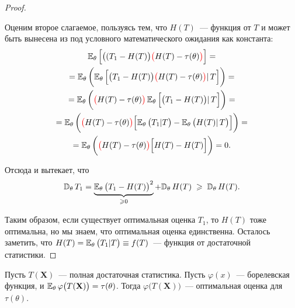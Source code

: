 \begin{proof}
\begin{enumerate}
            Оценим второе слагаемое, пользуясь тем, что $H(T)$~--- функция от $T$ и может быть вынесена из под условного математического ожидания как константа:
            \begin{gather*}
                \mathbb{E}_{\theta}\, \Bigl[ \bigl((T_{1}-H(T)\bigr) {\color{red}\bigl(} H(T) - \tau(\theta) {\color{red}\bigr)} \Bigr] = \\
                = \mathbb{E}_{\theta}\,\biggl( \mathbb{E}_{\theta}\,\Bigl[ \bigl(T_{1}-H(T)\bigr) {\color{red}\bigl(} H(T)-\tau(\theta) {\color{red}\bigr)} | \, T \Bigr] \biggr) = \\
                = \mathbb{E}_{\theta}\,\biggl( {\color{red}\bigl(} H(T)-\tau(\theta) {\color{red}\bigr)} \, \mathbb{E}_{\theta}\, \Bigl[ \bigl(T_{1} - H(T)\bigr) | \, T \Bigr] \biggr) = \\
                = \mathbb{E}_{\theta}\,\biggl( {\color{red}\bigl(} H(T)-\tau(\theta) {\color{red}\bigr)} \Bigl[ \mathbb{E}_{\theta}\, \bigl(T_{1} | T\bigr) - \mathbb{E}_{\theta}\, \bigl(H(T) | \, T \bigr) \Bigr] \biggr) = \\
                = \mathbb{E}_{\theta}\,\biggl( {\color{red}\bigl(} H(T)-\tau(\theta) {\color{red}\bigr)} \Bigl[ H(T) - H(T) \Bigr] \biggr) = 0.
            \end{gather*}

            Отсюда и вытекает, что
            \begin{equation*}
                \mathbb{D}_{\theta}\, T_{1} = \underbrace{\mathbb{E}_{\theta}\, \bigl(T_1 - H(T)\bigr)^2}_{\geqslant 0} + \mathbb{D}_{\theta}\, H(T) \; \geqslant \; \mathbb{D}_{\theta}\, H(T).
            \end{equation*}
    \end{enumerate}
    Таким образом, если существует оптимальная оценка $T_1$, то $H(T)$ тоже оптимальна, но мы знаем, что оптимальная оценка единственна.
    Осталось заметить, что $H(T) = \mathbb{E}_{\theta}\, \bigl( T_1 | T\bigr) \equiv f(T)$~--- функция от достаточной статистики.
\end{proof}

\begin{namedthm}[Теорема Колмогорова]
    Пусть $T(\mathbf{X})$~--- полная достаточная статистика.
    Пусть $\varphi(x)$~--- борелевская функция, и $\mathbb{E}_{\theta}\, \varphi\bigl(T(\mathbf{X})\bigr) = \tau(\theta)$.
    Тогда $\varphi\bigl(T(\mathbf{X})\bigr)$~--- оптимальная оценка для $\tau(\theta)$.
\end{namedthm}


